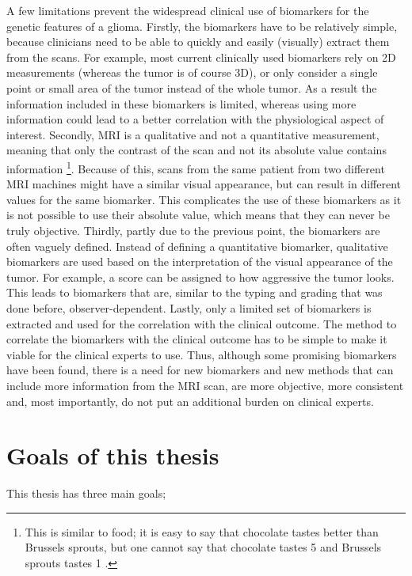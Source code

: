 A few limitations prevent the widespread clinical use of biomarkers for the genetic features of a \gls{glioma}.
Firstly, the biomarkers have to be relatively simple, because clinicians need to be able to quickly and easily (visually) extract them from the scans.
For example, most current clinically used biomarkers rely on 2D measurements (whereas the \gls{tumor} is of course 3D), or only consider a single point or small area of the \gls{tumor} instead of the whole \gls{tumor}.
As a result the information included in these biomarkers is limited, whereas using more information could lead to a better correlation with the physiological aspect of interest.
Secondly, \gls{MRI} is a qualitative and not a quantitative measurement, meaning that only the contrast of the scan and not its absolute value contains information \footnote{This is similar to food; it is easy to say that chocolate tastes better than Brussels sprouts, but one cannot say that chocolate tastes 5  and Brussels sprouts tastes 1 .}.
Because of this, scans from the same patient from two different \gls{MRI} machines might have a similar visual appearance, but can result in different values for the same biomarker.
This complicates the use of these biomarkers as it is not possible to use their absolute value, which means that they can never be truly objective.
Thirdly, partly due to the previous point, the biomarkers are often vaguely defined.
Instead of defining a quantitative biomarker, qualitative biomarkers are used based on the interpretation of the visual appearance of the \gls{tumor}.
For example, a score can be assigned to how aggressive the \gls{tumor} looks.
This leads to biomarkers that are, similar to the typing and grading that was done before, observer-dependent.
Lastly, only a limited set of biomarkers is extracted and used for the correlation with the clinical outcome.
The method to correlate the biomarkers with the clinical outcome has to be simple to make it viable for the clinical experts to use.
Thus, although some promising biomarkers have been found, there is a need for new biomarkers and new methods that can include more information from the \gls{MRI} scan, are more objective, more consistent and, most importantly, do not put an additional burden on clinical experts.


\section{Goals of this thesis}

This thesis has three main goals;

